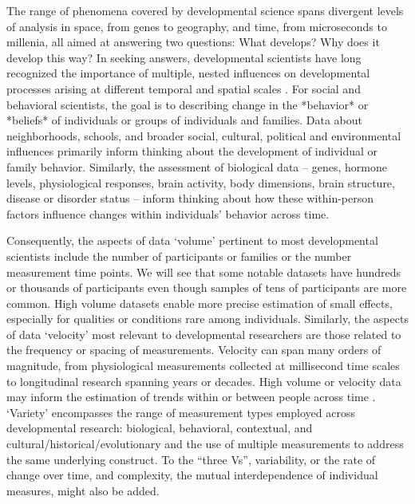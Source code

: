 \documentclass[letterpaper,man,apacite]{apa6}
\begin{document}
The range of phenomena covered by developmental science spans divergent levels of analysis in space, from genes to geography, and time, from microseconds to millenia, all aimed at answering two questions: What develops? Why does it develop this way?
In seeking answers, developmental scientists have long recognized the importance of multiple, nested influences on developmental processes arising at different temporal and spatial scales \cite{elman_rethinking_1998, gottlieb_normally_1998, oyama_ontogeny_2000, vygotsky_mind_1980}.
For social and behavioral scientists, the goal is to describing change in the *behavior* or *beliefs* of individuals or groups of individuals and families.
Data about neighborhoods, schools, and broader social, cultural, political and environmental influences primarily inform thinking about the development of individual or family behavior.
Similarly, the assessment of biological data -- genes, hormone levels, physiological responses, brain activity, body dimensions, brain structure, disease or disorder status -- inform thinking about how these within-person factors influence changes within individuals' behavior across time.

Consequently, the aspects of data `volume' pertinent to most developmental scientists include the number of participants or families or the number measurement time points.
We will see that some notable datasets have hundreds or thousands of participants even though samples of tens of participants are more common.
High volume datasets enable more precise estimation of small effects, especially for qualities or conditions rare among individuals.
Similarly, the aspects of data `velocity' most relevant to developmental researchers are those related to the frequency or spacing of measurements.
Velocity can span many orders of magnitude, from physiological measurements collected at millisecond time scales to longitudinal research spanning years or decades.
High volume or velocity data may inform the estimation of trends within or between people across time \cite{rietveld_replicability_2014}.
`Variety' encompasses the range of measurement types employed across developmental research: biological, behavioral, contextual, and cultural/historical/evolutionary and the use of multiple measurements to address the same underlying construct.
To the ``three Vs'', variability, or the rate of change over time, and complexity, the mutual interdependence of individual measures, might also be added.
\end{document}
